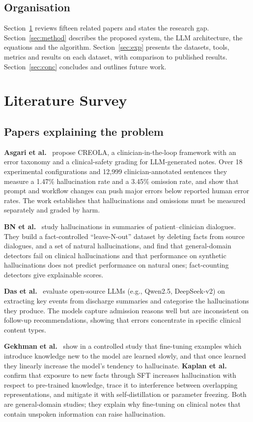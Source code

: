 \documentclass[conference]{IEEEtran}
\begin{document}
\subsection{Organisation}
Section~\ref{sec:lit} reviews fifteen related papers and states the research gap.
Section~\ref{sec:method} describes the proposed system, the LLM architecture, the equations and the
algorithm. Section~\ref{sec:exp} presents the datasets, tools, metrics and results on each dataset, with
comparison to published results. Section~\ref{sec:conc} concludes and outlines future work.

\section{Literature Survey}\label{sec:lit}

\subsection{Papers explaining the problem}
\textbf{Asgari et al.}~\cite{asgari2025} propose CREOLA, a clinician-in-the-loop framework with an error
taxonomy and a clinical-safety grading for LLM-generated notes. Over 18 experimental configurations and
12,999 clinician-annotated sentences they measure a 1.47\% hallucination rate and a 3.45\% omission rate,
and show that prompt and workflow changes can push major errors below reported human error rates. The
work establishes that hallucinations and omissions must be measured separately and graded by harm.

\textbf{BN et al.}~\cite{bn2025fact} study hallucinations in summaries of patient--clinician dialogues.
They build a fact-controlled ``leave-N-out'' dataset by deleting facts from source dialogues, and a set of
natural hallucinations, and find that general-domain detectors fail on clinical hallucinations and that
performance on synthetic hallucinations does not predict performance on natural ones; fact-counting
detectors give explainable scores.

\textbf{Das et al.}~\cite{das2025} evaluate open-source LLMs (e.g., Qwen2.5, DeepSeek-v2) on extracting key
events from discharge summaries and categorise the hallucinations they produce. The models capture
admission reasons well but are inconsistent on follow-up recommendations, showing that errors concentrate
in specific clinical content types.

\textbf{Gekhman et al.}~\cite{gekhman2024} show in a controlled study that fine-tuning examples which
introduce knowledge new to the model are learned slowly, and that once learned they linearly increase the
model's tendency to hallucinate. \textbf{Kaplan et al.}~\cite{kaplan2026} confirm that exposure to new
facts through SFT increases hallucination with respect to pre-trained knowledge, trace it to interference
between overlapping representations, and mitigate it with self-distillation or parameter freezing. Both are
general-domain studies; they explain why fine-tuning on clinical notes that contain unspoken information
can raise hallucination.
\end{document}
